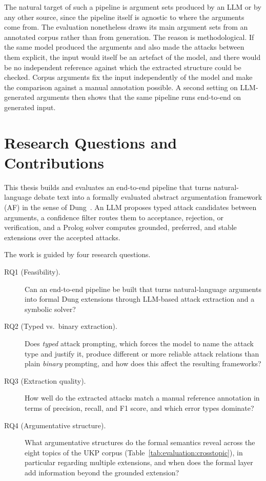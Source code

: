 The natural target of such a pipeline is argument sets produced by an LLM or
by any other source, since the pipeline itself is agnostic to where the
arguments come from. The evaluation
nonetheless draws its main argument sets from an annotated corpus rather than
from generation. The reason is methodological. If the same model produced the
arguments and also made the attacks between them explicit, the input would
itself be an artefact of the model, and there would be no independent
reference against which the extracted structure could be checked. Corpus
arguments fix the input independently of the model and make the comparison
against a manual annotation possible. A second setting on
LLM-generated arguments then shows that the same pipeline runs end-to-end on
generated input.

\section{Research Questions and Contributions}
\label{sec:intro:rqs}

This thesis builds and evaluates an end-to-end pipeline that turns
natural-language debate text into a formally evaluated abstract argumentation
framework (AF) in the sense of Dung~\cite{dung1995}. An LLM proposes
typed attack candidates between arguments, a confidence filter routes them
to acceptance, rejection, or verification, and a Prolog solver computes grounded,
preferred, and stable extensions over the accepted attacks.

The work is guided by four research questions.

\begin{description}
  \item[RQ1 (Feasibility).] Can an end-to-end pipeline be built that turns
    natural-language arguments into formal Dung extensions through LLM-based
    attack extraction and a symbolic solver?
  \item[RQ2 (Typed vs.\ binary extraction).] Does \emph{typed} attack prompting,
    which forces the model to name the attack type and justify it, produce
    different or more reliable attack relations than plain \emph{binary}
    prompting, and how does this affect the resulting frameworks?
  \item[RQ3 (Extraction quality).] How well do the extracted attacks match a
    manual reference annotation in terms of precision, recall, and F1 score,
    and which error types dominate?
  \item[RQ4 (Argumentative structure).] What argumentative structures do the
    formal semantics reveal across the eight topics of the UKP corpus
    (Table~\ref{tab:evaluation:crosstopic}), in particular regarding
    multiple extensions, and when does the formal layer add
    information beyond the grounded extension?
\end{description}

